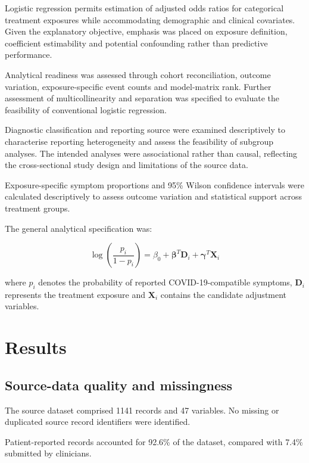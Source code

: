 \documentclass[
  british,
]{article}
\begin{document}
Logistic regression permits estimation of adjusted odds ratios for
categorical treatment exposures while accommodating demographic and
clinical covariates. Given the explanatory objective, emphasis was
placed on exposure definition, coefficient estimability and potential
confounding rather than predictive performance.

Analytical readiness was assessed through cohort reconciliation, outcome
variation, exposure-specific event counts and model-matrix rank. Further
assessment of multicollinearity and separation was specified to evaluate
the feasibility of conventional logistic regression.

Diagnostic classification and reporting source were examined
descriptively to characterise reporting heterogeneity and assess the
feasibility of subgroup analyses. The intended analyses were
associational rather than causal, reflecting the cross-sectional study
design and limitations of the source data.

Exposure-specific symptom proportions and 95\% Wilson confidence
intervals were calculated descriptively to assess outcome variation and
statistical support across treatment groups.

The general analytical specification was:

\[
\log\left(\frac{p_i}{1-p_i}\right)
=
\beta_0 +
\boldsymbol{\beta}^{T}\mathbf{D}_i +
\boldsymbol{\gamma}^{T}\mathbf{X}_i
\]

where \(p_i\) denotes the probability of reported COVID-19-compatible
symptoms, \(\mathbf{D}_i\) represents the treatment exposure and
\(\mathbf{X}_i\) contains the candidate adjustment variables.

\section{Results}\label{results}

\subsection{Source-data quality and
missingness}\label{source-data-quality-and-missingness}

The source dataset comprised 1141 records and 47 variables. No missing
or duplicated source record identifiers were identified.

Patient-reported records accounted for 92.6\% of the dataset, compared
with 7.4\% submitted by clinicians.
\end{document}
